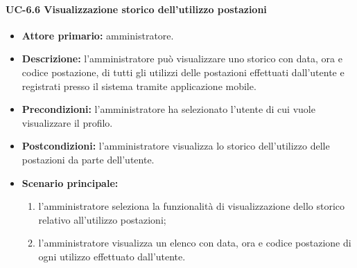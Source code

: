     \paragraph{UC-6.6 Visualizzazione storico dell'utilizzo postazioni}
    \begin{itemize}
        \item \textbf{Attore primario:} amministratore.
        
        \item \textbf{Descrizione:} l'amministratore può visualizzare uno storico con data, ora e codice postazione, di tutti gli utilizzi delle postazioni effettuati dall'utente e registrati presso il sistema tramite applicazione mobile.
        
        \item \textbf{Precondizioni:} l'amministratore ha selezionato l'utente di cui vuole visualizzare il profilo.
    
        \item \textbf{Postcondizioni:} l'amministratore visualizza lo storico dell'utilizzo delle postazioni da parte dell'utente.
    
        \item \textbf{Scenario principale:}
        \begin{enumerate}
            \item  l'amministratore seleziona la funzionalità di visualizzazione dello storico relativo all'utilizzo postazioni;
            \item l'amministratore visualizza un elenco con data, ora e codice postazione di ogni utilizzo effettuato dall'utente.
        \end{enumerate}
    \end{itemize}

